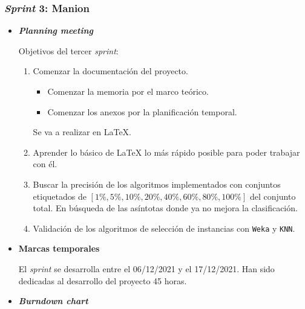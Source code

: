 \subsubsection{\textit{Sprint} 3: Manion}
\begin{itemize}
\item \textbf{\textit{Planning meeting}}

Objetivos del tercer \textit{sprint}:
\begin{enumerate}
\item Comenzar la documentación del proyecto.
\begin{itemize}
\item Comenzar la memoria por el marco teórico.
\item Comenzar los anexos por la planificación temporal.
\end{itemize} 
Se va a realizar en \LaTeX.
\item Aprender lo básico de \LaTeX{} lo más rápido posible para poder trabajar con él.
\item Buscar la precisión de los algoritmos implementados con conjuntos etiquetados de $[1\%, 5\%, 10\%, 20\%, 40\%, 60\%, 80\%, 100\%]$ del conjunto total. En búsqueda de las asíntotas donde ya no mejora la clasificación.
\item Validación de los algoritmos de selección de instancias con \texttt{Weka} y \texttt{KNN}.
\end{enumerate}
\item \textbf{Marcas temporales}

El \textit{sprint} se desarrolla entre el 06/12/2021 y el 17/12/2021. Han sido dedicadas al desarrollo del proyecto 45 horas.

\item \textbf{\textit{Burndown chart}}


\end{itemize}
